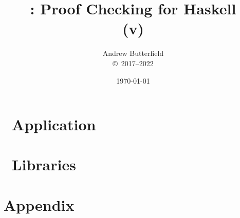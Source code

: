 \documentclass[fleqn,10pt]{report}
\author{
Andrew Butterfield
\\
{\small \copyright\ 2017--2022}
}
\title{
  \prfchk: Proof Checking for Haskell
  \\(v\version)
}
\date{
\today
}
\begin{document}
\maketitle
\tableofcontents

\chapter{\prfchk\ Application}



\chapter{\prfchk\ Libraries}


\newpage

\newpage

\newpage

\newpage


\appendix

\chapter{Appendix}


\newpage

\end{document}
